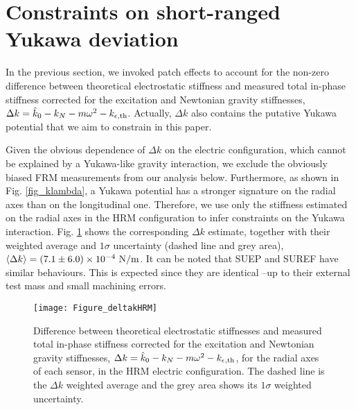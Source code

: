 \documentclass[12pt]{iopart}
\begin{document}
\begin{landscape}

\end{landscape}



\section{Constraints on short-ranged Yukawa deviation} \label{sect_results}

In the previous section, we invoked patch effects to account for the non-zero difference between theoretical electrostatic stiffness and measured total in-phase stiffness corrected for the excitation and Newtonian gravity stiffnesses, $\Delta k = \hat{k}_0 - k_N - m \omega^2 - k_{\epsilon, {\rm th}}$. Actually, $\Delta k$ also contains the putative Yukawa potential that we aim to constrain in this paper.

Given the obvious dependence of $\Delta k$ on the electric configuration, which cannot be explained by a Yukawa-like gravity interaction, we exclude the obviously biased FRM measurements from our analysis below. Furthermore, as shown in Fig. \ref{fig_klambda}, a Yukawa potential has a stronger signature on the radial axes than on the longitudinal one. Therefore, we use only the stiffness estimated on the radial axes in the HRM configuration to infer constraints on the Yukawa interaction.
Fig. \ref{fig_deltakHRM} shows the corresponding $\Delta k$ estimate, together with their weighted average and $1\sigma$ uncertainty (dashed line and grey area), $\langle \Delta k \rangle = (7.1\pm6.0)\times10^{-4}~{\rm N/m}$.
It can be noted that SUEP and SUREF have similar behaviours. This is expected since they are identical --up to their external test mass and small machining errors.


\begin{figure}%
\begin{center}
\texttt{[image: Figure\_deltakHRM]}
\caption{Difference between theoretical electrostatic stiffnesses and measured total in-phase stiffness corrected for the excitation and Newtonian gravity stiffnesses, $\Delta k = \hat{k}_0 - k_N - m \omega^2 - k_{\epsilon, {\rm th}}$, for the radial axes of each sensor, in the HRM electric configuration. The dashed line is the $\Delta k$ weighted average and the grey area shows its  $1\sigma$ weighted uncertainty.}
\label{fig_deltakHRM}
\end{center}
\end{figure}
\end{document}
